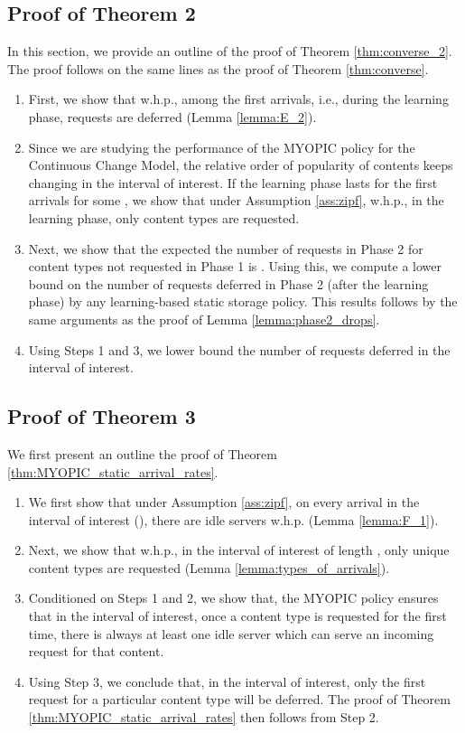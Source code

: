 \documentclass[10pt, conference, letterpaper]{IEEEtran}
\begin{document}
\subsection{Proof of Theorem 2}
In this section, we provide an outline of the proof of Theorem \ref{thm:converse_2}. The proof follows on the same lines as the proof of Theorem \ref{thm:converse}.
\begin{enumerate}
	\item First, we show that w.h.p., among the first  arrivals, i.e., during the learning phase,  requests are deferred (Lemma \ref{lemma:E_2}).
	\item Since we are studying the performance of the MYOPIC policy for the Continuous Change Model, the relative order of popularity of contents keeps changing in the interval of interest. If the learning phase lasts for the first  arrivals for some , we show that under Assumption \ref{ass:zipf}, w.h.p., in the learning phase, only  content types are requested.
	\item Next, we show that the expected the number of requests in Phase 2 for content types not requested in Phase 1 is . Using this, we compute a lower bound on the number of requests deferred in Phase 2 (after the learning phase) by any learning-based static storage policy. This results follows by the same arguments as the proof of Lemma \ref{lemma:phase2_drops}.
	\item Using Steps 1 and 3, we lower bound the number of requests deferred in the interval of interest.
\end{enumerate}


\subsection{Proof of Theorem 3}
\label{sec:proof3}

\noindent We first present an outline the proof of Theorem \ref{thm:MYOPIC_static_arrival_rates}.

\begin{enumerate}
	\item We first show that under Assumption \ref{ass:zipf}, on every arrival in the interval of interest (), there are  idle servers w.h.p. (Lemma \ref{lemma:F_1}).
	\item Next, we show that w.h.p., in the interval of interest of length , only  unique content types are requested (Lemma \ref{lemma:types_of_arrivals}).
	\item Conditioned on Steps 1 and 2, we show that, the MYOPIC policy ensures that in the interval of interest, once a content type is requested for the first time, there is always at least one idle server which can serve an incoming request for that content.
	\item Using Step 3, we conclude that, in the interval of interest, only the first request for a particular content type will be deferred. The proof of Theorem \ref{thm:MYOPIC_static_arrival_rates} then follows from Step 2.
\end{enumerate}
\end{document}
